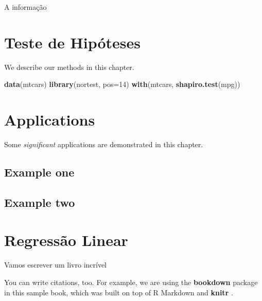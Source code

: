 \documentclass[]{book}
\newenvironment{Shaded}{\begin{snugshade}}{\end{snugshade}}
\newcommand{\KeywordTok}[1]{\textcolor[rgb]{0.13,0.29,0.53}{\textbf{#1}}}
\newcommand{\DataTypeTok}[1]{\textcolor[rgb]{0.13,0.29,0.53}{#1}}
\newcommand{\DecValTok}[1]{\textcolor[rgb]{0.00,0.00,0.81}{#1}}
\newcommand{\NormalTok}[1]{#1}
\theoremstyle{definition}
\theoremstyle{definition}
\theoremstyle{definition}
\theoremstyle{remark}
\begin{document}
A informação

\chapter{Teste de Hipóteses}\label{teste-de-hipoteses}

We describe our methods in this chapter.

\begin{Shaded}
\begin{Highlighting}[]
\KeywordTok{data}\NormalTok{(mtcars)}
\KeywordTok{library}\NormalTok{(nortest, }\DataTypeTok{pos=}\DecValTok{14}\NormalTok{)}
\KeywordTok{with}\NormalTok{(mtcars, }\KeywordTok{shapiro.test}\NormalTok{(mpg))}
\end{Highlighting}
\end{Shaded}

\chapter{Applications}\label{applications}

Some \emph{significant} applications are demonstrated in this chapter.

\section{Example one}\label{example-one}

\section{Example two}\label{example-two}

\chapter{Regressão Linear}\label{regressao-linear}

Vamos escrever um livro incrível

You can write citations, too. For example, we are using the
\textbf{bookdown} package \citep{R-bookdown} in this sample book, which
was built on top of R Markdown and \textbf{knitr} \citep{xie2015}.


\end{document}

